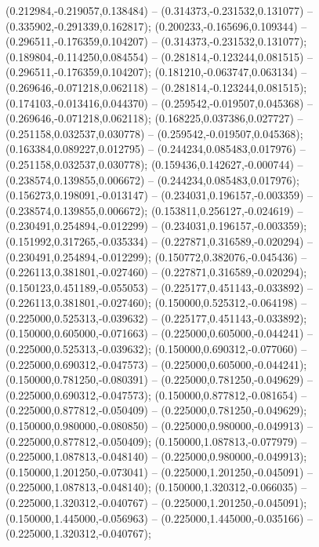  (0.212984,-0.219057,0.138484) -- (0.314373,-0.231532,0.131077) -- (0.335902,-0.291339,0.162817);
 (0.200233,-0.165696,0.109344) -- (0.296511,-0.176359,0.104207) -- (0.314373,-0.231532,0.131077);
 (0.189804,-0.114250,0.084554) -- (0.281814,-0.123244,0.081515) -- (0.296511,-0.176359,0.104207);
 (0.181210,-0.063747,0.063134) -- (0.269646,-0.071218,0.062118) -- (0.281814,-0.123244,0.081515);
 (0.174103,-0.013416,0.044370) -- (0.259542,-0.019507,0.045368) -- (0.269646,-0.071218,0.062118);
 (0.168225,0.037386,0.027727) -- (0.251158,0.032537,0.030778) -- (0.259542,-0.019507,0.045368);
 (0.163384,0.089227,0.012795) -- (0.244234,0.085483,0.017976) -- (0.251158,0.032537,0.030778);
 (0.159436,0.142627,-0.000744) -- (0.238574,0.139855,0.006672) -- (0.244234,0.085483,0.017976);
 (0.156273,0.198091,-0.013147) -- (0.234031,0.196157,-0.003359) -- (0.238574,0.139855,0.006672);
 (0.153811,0.256127,-0.024619) -- (0.230491,0.254894,-0.012299) -- (0.234031,0.196157,-0.003359);
 (0.151992,0.317265,-0.035334) -- (0.227871,0.316589,-0.020294) -- (0.230491,0.254894,-0.012299);
 (0.150772,0.382076,-0.045436) -- (0.226113,0.381801,-0.027460) -- (0.227871,0.316589,-0.020294);
 (0.150123,0.451189,-0.055053) -- (0.225177,0.451143,-0.033892) -- (0.226113,0.381801,-0.027460);
 (0.150000,0.525312,-0.064198) -- (0.225000,0.525313,-0.039632) -- (0.225177,0.451143,-0.033892);
 (0.150000,0.605000,-0.071663) -- (0.225000,0.605000,-0.044241) -- (0.225000,0.525313,-0.039632);
 (0.150000,0.690312,-0.077060) -- (0.225000,0.690312,-0.047573) -- (0.225000,0.605000,-0.044241);
 (0.150000,0.781250,-0.080391) -- (0.225000,0.781250,-0.049629) -- (0.225000,0.690312,-0.047573);
 (0.150000,0.877812,-0.081654) -- (0.225000,0.877812,-0.050409) -- (0.225000,0.781250,-0.049629);
 (0.150000,0.980000,-0.080850) -- (0.225000,0.980000,-0.049913) -- (0.225000,0.877812,-0.050409);
 (0.150000,1.087813,-0.077979) -- (0.225000,1.087813,-0.048140) -- (0.225000,0.980000,-0.049913);
 (0.150000,1.201250,-0.073041) -- (0.225000,1.201250,-0.045091) -- (0.225000,1.087813,-0.048140);
 (0.150000,1.320312,-0.066035) -- (0.225000,1.320312,-0.040767) -- (0.225000,1.201250,-0.045091);
 (0.150000,1.445000,-0.056963) -- (0.225000,1.445000,-0.035166) -- (0.225000,1.320312,-0.040767);
